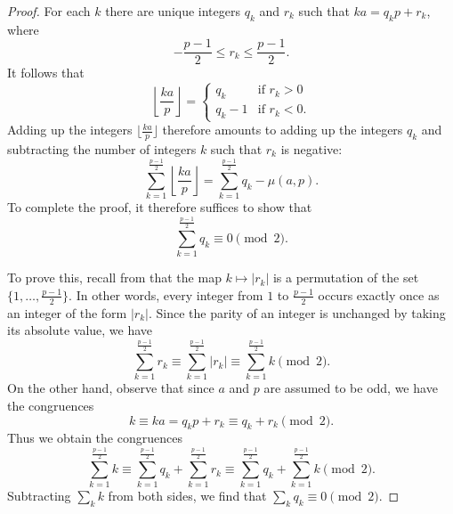 \begin{proof}
  For each $k$ there are unique integers $q_k$ and $r_k$ such that $ka=q_kp+r_k$, where
  \begin{equation*}
    -\frac{p-1}{2}\leq r_k\leq \frac{p-1}{2}.
  \end{equation*}
  It follows that
  \begin{equation*}
    \left\lfloor\frac{ka}{p}\right\rfloor=
    \begin{cases}
      q_k & \text{if }r_k>0\\
      q_{k}-1 & \text{if }r_k<0.
    \end{cases}
  \end{equation*}
  Adding up the integers $\lfloor\frac{ka}{p}\rfloor$ therefore amounts to adding up the integers $q_k$ and subtracting the number of integers $k$ such that $r_k$ is negative:
  \begin{equation*}
    \sum_{k=1}^{\frac{p-1}{2}}\left\lfloor\frac{ka}{p}\right\rfloor = \sum_{k=1}^{\frac{p-1}{2}}q_k-\mu(a,p).
  \end{equation*}
  To complete the proof, it therefore suffices to show that
  \begin{equation*}
    \sum_{k=1}^{\frac{p-1}{2}}q_k \equiv 0\pmod{2}.
  \end{equation*}

  To prove this, recall from  that the map $k\mapsto |r_k|$ is a permutation of the set $\{1,\ldots,\frac{p-1}{2}\}$. In other words, every integer from $1$ to $\frac{p-1}{2}$ occurs exactly once as an integer of the form $|r_k|$. Since the parity of an integer is unchanged by taking its absolute value, we have
  \begin{equation*}
    \sum_{k=1}^{\frac{p-1}{2}}r_k \equiv \sum_{k=1}^{\frac{p-1}{2}}|r_k| \equiv \sum_{k=1}^{\frac{p-1}{2}}k \pmod{2}.
  \end{equation*}
  On the other hand, observe that since $a$ and $p$ are assumed to be odd, we have the congruences
  \begin{equation*}
    k\equiv ka = q_kp + r_k \equiv q_k+r_k\pmod{2}.
  \end{equation*}
  Thus we obtain the congruences
  \begin{equation*}
    \sum_{k=1}^{\frac{p-1}{2}}k\equiv\sum_{k=1}^{\frac{p-1}{2}}q_k + \sum_{k=1}^{\frac{p-1}{2}}r_k \equiv\sum_{k=1}^{\frac{p-1}{2}}q_k + \sum_{k=1}^{\frac{p-1}{2}}k \pmod{2}.
  \end{equation*}
  Subtracting $\sum_k k$ from both sides, we find that $\sum_k q_k\equiv 0\pmod{2}$.
\end{proof}

